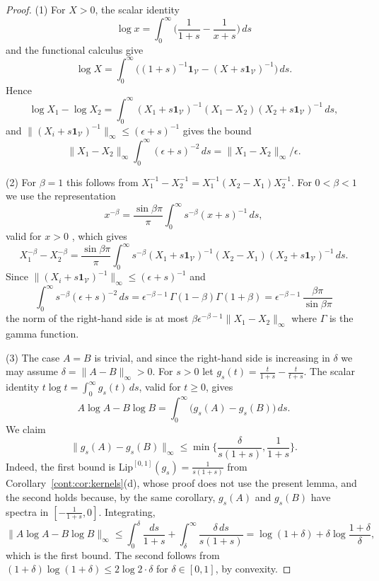 \begin{proof}
(1) For $X>0$, the scalar identity \[\log x=\int_0^\infty\big(\frac{1}{1+s}-\frac{1}{x+s}\big)\,ds\] and the functional calculus give \[\log X=\int_0^\infty\big((1+s)^{-1}\mathbf{1}_{\mathcal{V}}-(X+s\mathbf{1}_{\mathcal{V}})^{-1}\big)\,ds.\] Hence
\[
\log X_1-\log X_2=\int_0^\infty(X_1+s\mathbf{1}_{\mathcal{V}})^{-1}(X_1-X_2)(X_2+s\mathbf{1}_{\mathcal{V}})^{-1}\,ds,
\]
and $\|(X_i+s\mathbf{1}_{\mathcal{V}})^{-1}\|_\infty\leq(\epsilon+s)^{-1}$ gives the bound
\[
\|X_1-X_2\|_\infty\int_0^\infty(\epsilon+s)^{-2}\,ds=\|X_1-X_2\|_\infty/\epsilon.
\]


(2) For $\beta=1$ this follows from $X_1^{-1}-X_2^{-1}=X_1^{-1}(X_2-X_1)X_2^{-1}$. For $0<\beta<1$ we use the representation
\[
x^{-\beta}=\frac{\sin\beta\pi}{\pi}\int_0^\infty s^{-\beta}(x+s)^{-1}\,ds,
\]
valid for $x>0$ \cite[Chapter~V]{bhatia1997matrix}, which gives
\[
X_1^{-\beta}-X_2^{-\beta}=\frac{\sin\beta\pi}{\pi}\int_0^\infty s^{-\beta}(X_1+s\mathbf{1}_{\mathcal{V}})^{-1}(X_2-X_1)(X_2+s\mathbf{1}_{\mathcal{V}})^{-1}\,ds .
\]
Since $\|(X_i+s\mathbf{1}_{\mathcal{V}})^{-1}\|_\infty\leq(\epsilon+s)^{-1}$ and \[\int_0^\infty s^{-\beta}(\epsilon+s)^{-2}\,ds=\epsilon^{-\beta-1}\,\Gamma(1-\beta)\Gamma(1+\beta)=\epsilon^{-\beta-1}\,\frac{\beta\pi}{\sin\beta\pi}\] the norm of the right-hand side is at most $\beta\epsilon^{-\beta-1}\|X_1-X_2\|_\infty$ where $\Gamma$ is the gamma function.

(3) The case $A=B$ is trivial, and since the right-hand side is increasing in $\delta$ we may assume $\delta=\|A-B\|_\infty>0$. For $s>0$ let $g_s(t)=\frac{t}{1+s}-\frac{t}{t+s}$. The scalar identity $t\log t=\int_0^\infty g_s(t)\,ds$, valid for $t\geq0$, gives
\[
A\log A-B\log B=\int_0^\infty\big(g_s(A)-g_s(B)\big)\,ds.
\]
We claim
\[
\|g_s(A)-g_s(B)\|_\infty\leq\min\Big\{\frac{\delta}{s(1+s)},\frac1{1+s}\Big\}.
\]
Indeed, the first bound is $\mathrm{Lip}^{[0,1]}(g_s)=\frac1{s(1+s)}$ from Corollary~\ref{cont:cor:kernels}(d), whose proof does not use the present lemma, and the second holds because, by the same corollary, $g_s(A)$ and $g_s(B)$ have spectra in $[-\frac1{1+s},0]$. Integrating,
\[
\|A\log A-B\log B\|_\infty\leq\int_0^\delta\frac{ds}{1+s}+\int_\delta^\infty\frac{\delta\,ds}{s(1+s)}=\log(1+\delta)+\delta\log\frac{1+\delta}{\delta},
\]
which is the first bound. The second follows from $(1+\delta)\log(1+\delta)\leq2\log2\cdot\delta$ for $\delta\in[0,1]$, by convexity.


\end{proof}
